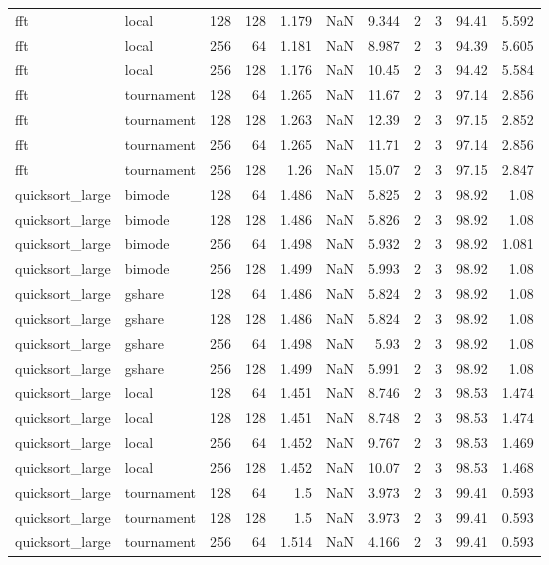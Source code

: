 \begin{tabular}{llrrrrrrrrr}
fft & local & 128 & 128 & 1.179 & NaN & 9.344 & 2 & 3 & 94.41 & 5.592 \\
fft & local & 256 & 64 & 1.181 & NaN & 8.987 & 2 & 3 & 94.39 & 5.605 \\
fft & local & 256 & 128 & 1.176 & NaN & 10.45 & 2 & 3 & 94.42 & 5.584 \\
fft & tournament & 128 & 64 & 1.265 & NaN & 11.67 & 2 & 3 & 97.14 & 2.856 \\
fft & tournament & 128 & 128 & 1.263 & NaN & 12.39 & 2 & 3 & 97.15 & 2.852 \\
fft & tournament & 256 & 64 & 1.265 & NaN & 11.71 & 2 & 3 & 97.14 & 2.856 \\
fft & tournament & 256 & 128 & 1.26 & NaN & 15.07 & 2 & 3 & 97.15 & 2.847 \\
quicksort_large & bimode & 128 & 64 & 1.486 & NaN & 5.825 & 2 & 3 & 98.92 & 1.08 \\
quicksort_large & bimode & 128 & 128 & 1.486 & NaN & 5.826 & 2 & 3 & 98.92 & 1.08 \\
quicksort_large & bimode & 256 & 64 & 1.498 & NaN & 5.932 & 2 & 3 & 98.92 & 1.081 \\
quicksort_large & bimode & 256 & 128 & 1.499 & NaN & 5.993 & 2 & 3 & 98.92 & 1.08 \\
quicksort_large & gshare & 128 & 64 & 1.486 & NaN & 5.824 & 2 & 3 & 98.92 & 1.08 \\
quicksort_large & gshare & 128 & 128 & 1.486 & NaN & 5.824 & 2 & 3 & 98.92 & 1.08 \\
quicksort_large & gshare & 256 & 64 & 1.498 & NaN & 5.93 & 2 & 3 & 98.92 & 1.08 \\
quicksort_large & gshare & 256 & 128 & 1.499 & NaN & 5.991 & 2 & 3 & 98.92 & 1.08 \\
quicksort_large & local & 128 & 64 & 1.451 & NaN & 8.746 & 2 & 3 & 98.53 & 1.474 \\
quicksort_large & local & 128 & 128 & 1.451 & NaN & 8.748 & 2 & 3 & 98.53 & 1.474 \\
quicksort_large & local & 256 & 64 & 1.452 & NaN & 9.767 & 2 & 3 & 98.53 & 1.469 \\
quicksort_large & local & 256 & 128 & 1.452 & NaN & 10.07 & 2 & 3 & 98.53 & 1.468 \\
quicksort_large & tournament & 128 & 64 & 1.5 & NaN & 3.973 & 2 & 3 & 99.41 & 0.593 \\
quicksort_large & tournament & 128 & 128 & 1.5 & NaN & 3.973 & 2 & 3 & 99.41 & 0.593 \\
quicksort_large & tournament & 256 & 64 & 1.514 & NaN & 4.166 & 2 & 3 & 99.41 & 0.593 \\

\end{tabular}
